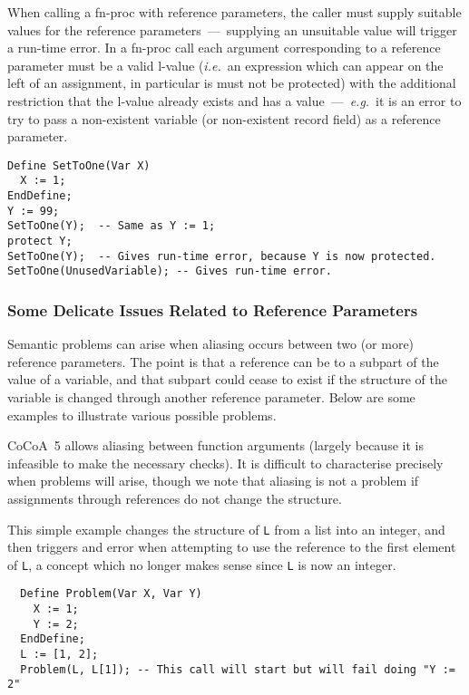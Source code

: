 \documentclass{book}[12,a4paper]
\def\ie{{\it i.e.}}
\def\eg{{\it e.g.}}
\begin{document}
When calling a fn-proc with reference parameters, the caller must supply
suitable values for the reference parameters~---~supplying an unsuitable
value will trigger a run-time error.  In a fn-proc call each argument
corresponding to a reference parameter must be a valid l-value (\ie~an
expression which can appear on the left of an assignment, in particular is
must not be protected) with the additional restriction that the l-value
already exists and has a value~---~\eg~it is an error to try to pass a
non-existent variable (or non-existent record field) as a reference
parameter.  

\begin{lstlisting}
Define SetToOne(Var X)
  X := 1;
EndDefine;
Y := 99;
SetToOne(Y);  -- Same as Y := 1;
protect Y;
SetToOne(Y);  -- Gives run-time error, because Y is now protected.
SetToOne(UnusedVariable); -- Gives run-time error.
\end{lstlisting}


\subsubsection{Some Delicate Issues Related to Reference Parameters}
\label{delicate-issues}

Semantic problems can arise when aliasing occurs between two (or more)
reference parameters.  The point is that a reference can be to a subpart
of the value of a variable, and that subpart could cease to exist if
the structure of the variable is changed through another reference
parameter.  Below are some examples to illustrate various possible problems.

CoCoA~5 allows aliasing between function arguments (largely because it is
infeasible to make the necessary checks).  It is difficult to characterise
precisely when problems will arise, though we note that aliasing is not a
problem if assignments through references do not change the structure.

This simple example changes the structure of \texttt{L} from a list into an
integer, and then triggers and error when attempting to use the reference
to the first element of \texttt{L}, a concept which no longer makes sense since
\texttt{L} is now an integer.
\begin{lstlisting}
  Define Problem(Var X, Var Y)
    X := 1;
    Y := 2;
  EndDefine;
  L := [1, 2];
  Problem(L, L[1]); -- This call will start but will fail doing "Y := 2"
\end{lstlisting}
\end{document}
